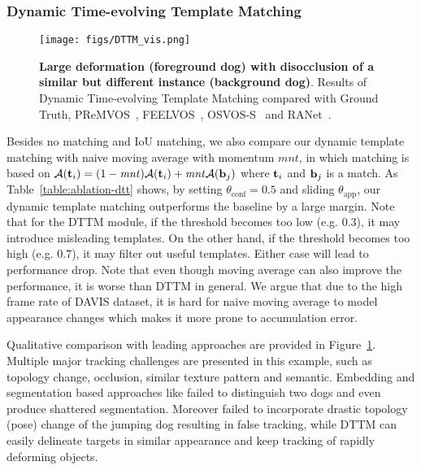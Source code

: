 \documentclass[10pt,twocolumn,letterpaper]{article}
\begin{document}
\vspace{-0.5em}
\subsubsection{Dynamic Time-evolving Template Matching}

\begin{figure}[t]
\begin{center}
   \texttt{[image: figs/DTTM\_vis.png]}
\end{center}
    \caption{{\bf Large deformation (foreground dog) with disocclusion of a similar but different instance (background dog)}. Results of Dynamic Time-evolving Template Matching compared with Ground Truth, PReMVOS~\cite{luiten2018premvos}, FEELVOS~\cite{voigtlaender2019feelvos}, OSVOS-S~\cite{caelles2017osvos} and RANet~\cite{wang2019ranet}.}
\label{fig:dttm-vis}
\end{figure}

Besides no matching and IoU matching, we also compare our dynamic template matching with naive moving average with momentum $\mathit{mnt}$, in which matching is based on $\mathcal{A}({\bf{t}}_i)=(1-\mathit{mnt})  \mathcal{A}({\bf{t}}_i) + \mathit{mnt} \mathcal{A}({\bf{b}}_j)$ where ${\bf{t}}_i$ and ${\bf{b}}_j$ is a match.
As Table~\ref{table:ablation-dtt} shows, by setting $\theta_{\text{conf}}=0.5$ and sliding $\theta_{\text{app}}$, our dynamic template matching outperforms the baseline by a large margin.
Note that for the DTTM module, if the threshold becomes too low (e.g. $0.3$), it may introduce misleading templates.
On the other hand, if the threshold becomes too high (e.g. $0.7$), it may filter out useful templates. Either case will lead to performance drop.
Note that even though moving average can also improve the performance, it is worse than DTTM in general.
We argue that due to the high frame rate of DAVIS dataset, it is hard for naive moving average to model appearance changes which makes it more prone to accumulation error.

Qualitative comparison with leading approaches are provided in Figure~\ref{fig:dttm-vis}.
Multiple major tracking challenges are presented in this example, such as topology change, occlusion, similar texture pattern and semantic. Embedding and segmentation based approaches like \cite{voigtlaender2019feelvos, caelles2017osvos, wang2019ranet} failed to distinguish two dogs and even produce shattered segmentation.
Moreover \cite{luiten2018premvos} failed to incorporate drastic topology (pose) change of the jumping dog resulting in false tracking, while DTTM can easily delineate targets in similar appearance and keep tracking of rapidly deforming objects.
\end{document}
